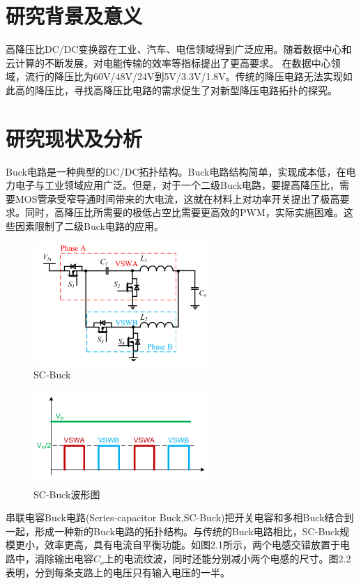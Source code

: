 \documentclass[12pt,a4paper]{report}
\begin{document}
\chapter{研究背景及意义}
高降压比DC/DC变换器在工业、汽车、电信领域得到广泛应用。随着数据中心和云计算的不断发展，对电能传输的效率等指标提出了更高要求。
在数据中心领域，流行的降压比为60V/48V/24V到5V/3.3V/1.8V。传统的降压电路无法实现如此高的降压比，寻找高降压比电路的需求促生了对新型降压电路拓扑的探究。
\chapter{研究现状及分析}
Buck电路是一种典型的DC/DC拓扑结构。Buck电路结构简单，实现成本低，在电力电子与工业领域应用广泛。但是，对于一个二级Buck电路，要提高降压比，需要MOS管承受窄导通时间带来的大电流，这就在材料上对功率开关提出了极高要求。同时，高降压比所需要的极低占空比需要更高效的PWM，实际实施困难。这些因素限制了二级Buck电路的应用。
\newline

\begin{figure}[h]
    \centering
    \includegraphics[width = 0.6\textwidth]{figures/SC-Buck.png}
    \caption{SC-Buck}
\end{figure}

\begin{figure}[h]
    \centering
    \includegraphics[width = 0.6\textwidth]{figures/SC-Buck_v.png}
    \caption{SC-Buck波形图}
\end{figure}

串联电容Buck电路(Series-capacitor Buck,SC-Buck)把开关电容和多相Buck结合到一起，形成一种新的Buck电路的拓扑结构。与传统的Buck电路相比，SC-Buck规模更小，效率更高，具有电流自平衡功能。如图2.1所示，两个电感交错放置于电路中，消除输出电容$C_o$上的电流纹波，同时还能分别减小两个电感的尺寸。图2.2表明，分到每条支路上的电压只有输入电压的一半。
\end{document}
